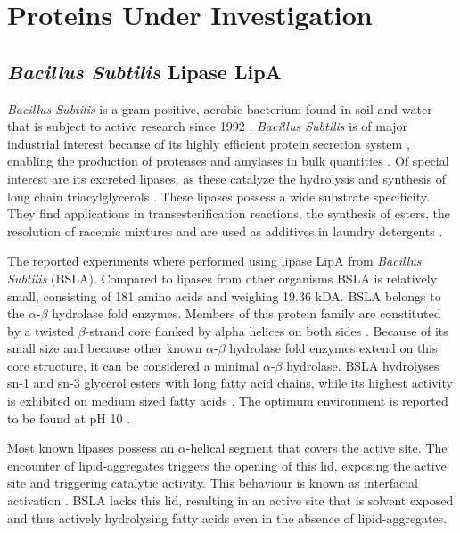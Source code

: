 \documentclass[english, a4paper, 12pt, titlepage, draft]{article}
\begin{document}

\section{Proteins Under Investigation}


\subsection{\textit{Bacillus Subtilis} Lipase LipA}

\textit{Bacillus Subtilis} is a gram-positive, aerobic bacterium found in soil and water that is subject to active research since 1992 \cite{bacillusSubtilis}.
\textit{Bacillus Subtilis} is of major industrial interest because of its highly efficient protein secretion system \cite{BSsecretion}, enabling the production of proteases and amylases in bulk quantities \cite{BSworkhorse}.
Of special interest are its excreted lipases, as these catalyze the hydrolysis and synthesis of long chain triacylglycerols \cite{BSLA_1I6W}.
These lipases possess a wide substrate specificity.
They find applications in transesterification reactions, the synthesis of esters, the resolution of racemic mixtures and are used as additives in laundry detergents \cite{BSdetergents}.

The reported experiments where performed using lipase LipA from \textit{Bacillus Subtilis} (BSLA).
Compared to lipases from other organisms BSLA is relatively small, consisting of 181 amino acids and weighing 19.36 kDA.
BSLA belongs to the $\alpha$-$\beta$ hydrolase fold enzymes.
Members of this protein family are constituted by a twisted $\beta$-strand core flanked by alpha helices on both sides \cite{alphaBetaHydrolases}.
Because of its small size and because other known $\alpha$-$\beta$ hydrolase fold enzymes extend on this core structure, it can be considered a minimal $\alpha$-$\beta$ hydrolase.
BSLA hydrolyses sn-1 and sn-3 glycerol esters with long fatty acid chains, while its highest activity is exhibited on medium sized fatty acids \cite{BSLA_1I6W}.
The optimum environment is reported to be found at pH 10 \cite{BSLA_1I6W}.

Most known lipases possess an $\alpha$-helical segment that covers the active site.
The encounter of lipid-aggregates triggers the opening of this lid, exposing the active site and triggering catalytic activity.
This behaviour is known as interfacial activation \cite{alphaBetaHydrolases}.
BSLA lacks this lid, resulting in an active site that is solvent exposed and thus actively hydrolysing fatty acids even in the absence of lipid-aggregates.
\end{document}
